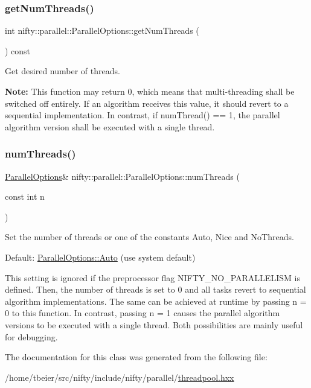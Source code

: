 \subsubsection{\texorpdfstring{get\+Num\+Threads()}{getNumThreads()}}
{\footnotesize\ttfamily int nifty\+::parallel\+::\+Parallel\+Options\+::get\+Num\+Threads (\begin{DoxyParamCaption}{ }\end{DoxyParamCaption}) const\hspace{0.3cm}{\ttfamily [inline]}}



Get desired number of threads. 

{\bfseries Note\+:} This function may return 0, which means that multi-\/threading shall be switched off entirely. If an algorithm receives this value, it should revert to a sequential implementation. In contrast, if {\ttfamily num\+Thread() == 1}, the parallel algorithm version shall be executed with a single thread. \mbox{\label{classnifty_1_1parallel_1_1ParallelOptions_a50e3d373c07fb36be7b3b39bf6886b9b}} 
\subsubsection{\texorpdfstring{num\+Threads()}{numThreads()}}
{\footnotesize\ttfamily \hyperlink{classnifty_1_1parallel_1_1ParallelOptions}{Parallel\+Options}\& nifty\+::parallel\+::\+Parallel\+Options\+::num\+Threads (\begin{DoxyParamCaption}\item[{const int}]{n }\end{DoxyParamCaption})\hspace{0.3cm}{\ttfamily [inline]}}



Set the number of threads or one of the constants {\ttfamily Auto}, {\ttfamily Nice} and {\ttfamily No\+Threads}. 

Default\+: {\ttfamily \hyperlink{classnifty_1_1parallel_1_1ParallelOptions_a7a945e8bd698883de4af0f906b2aa88aa0bd8f9fd00d78fcfdcb6ee1575f43fd6}{Parallel\+Options\+::\+Auto}} (use system default)

This setting is ignored if the preprocessor flag {\ttfamily N\+I\+F\+T\+Y\+\_\+\+N\+O\+\_\+\+P\+A\+R\+A\+L\+L\+E\+L\+I\+SM} is defined. Then, the number of threads is set to 0 and all tasks revert to sequential algorithm implementations. The same can be achieved at runtime by passing {\ttfamily n = 0} to this function. In contrast, passing {\ttfamily n = 1} causes the parallel algorithm versions to be executed with a single thread. Both possibilities are mainly useful for debugging. 

The documentation for this class was generated from the following file\+:\begin{DoxyCompactItemize}
\item 
/home/tbeier/src/nifty/include/nifty/parallel/\hyperlink{threadpool_8hxx}{threadpool.\+hxx}\end{DoxyCompactItemize}
